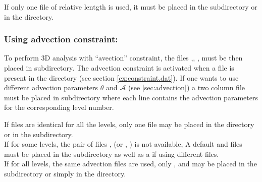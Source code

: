 If only one  file of relative lentgth is used, it must be placed in  the  subdirectory or in the  directory.

\begin{center}
\end{center}


\subsubsection{ Using advection constraint:}


To perform 3D analysis with  ``avection''  constraint, the files ,\linebreak {}, ,  must be then placed in  subdirectory. The advection constraint is activated when a  file is present in the  directory (see section \ref{ex:constraint.dat}). If one wants to use different advection parameters $\theta$ and $\mathcal{A}$ (see \ref{sec:advection}) a two column  file must be placed in  subdirectory where each line contains the advection parameters for the corresponding level number.

If  files are identical for all the levels, only one file  may be placed in the  directory or in the  subdirectory.\\
 If for some levels, the pair of files ,  (or , ) is not available, A default  and  files must be placed in the  subdirectory as well as a  if using different  files.\\
 If for all levels, the same advection files are used, only  ,  and  may be placed in the  subdirectory or simply in the  directory.


